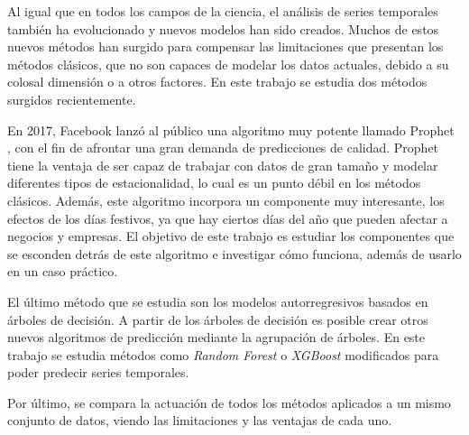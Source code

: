 \documentclass[12pt,twoside]{article}
\begin{document}
Al igual que en todos los campos de la ciencia, el análisis de series temporales también ha evolucionado y nuevos modelos han sido creados. Muchos de estos nuevos métodos han surgido para compensar las limitaciones que presentan los métodos clásicos, que no son capaces de modelar los datos actuales, debido a su colosal dimensión o a otros factores. En este trabajo se estudia dos métodos surgidos recientemente.

En 2017, Facebook lanzó al público una algoritmo muy potente llamado Prophet \cite{Prophet1}, con el fin de afrontar una gran demanda de predicciones de calidad. Prophet tiene la ventaja de ser capaz de trabajar con datos de gran tamaño y modelar diferentes tipos de estacionalidad, lo cual es un punto débil en los métodos clásicos. Además, este algoritmo incorpora un componente muy interesante, los efectos de los días festivos, ya que hay ciertos días del año que pueden afectar a negocios y empresas. El objetivo de este trabajo es estudiar los componentes que se esconden detrás de este algoritmo e investigar cómo funciona, además de usarlo en un caso práctico.

El último método que se estudia son los modelos autorregresivos basados en árboles de decisión. A partir de los árboles de decisión es posible crear otros nuevos algoritmos de predicción mediante la agrupación de árboles. En este trabajo se estudia métodos como \emph{Random Forest} o \emph{XGBoost} modificados \cite{DT3} para poder predecir series temporales. 

Por último, se compara la actuación de todos los métodos aplicados a un mismo conjunto de datos, viendo las limitaciones y las ventajas de cada uno.
\end{document}

